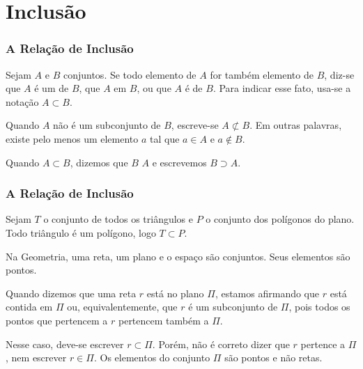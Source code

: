 \section{Inclusão}


\begin{frame}
\frametitle{A Relação de Inclusão} %

\begin{definicao}
Sejam $A$ e $B$ conjuntos. Se todo elemento de $A$ for também
elemento de $B$, diz-se que $A$ é um  de $B$, que
$A$  em $B$, ou que $A$ é  de $B$. Para
indicar esse fato, usa-se a notação $A \subset B$.

\end{definicao}

Quando $A$ não é um subconjunto de $B$, escreve-se $A \not\subset
B$. Em outras palavras, existe pelo menos um elemento $a$ tal que $a
\in A$ e $a \notin B$.
\bigskip

Quando $A \subset B$, dizemos que $B$  $A$ e escrevemos
$B \supset A$.


\end{frame}



\begin{frame}
\frametitle{A Relação de Inclusão} %

\begin{exemplo}
Sejam $T$ o conjunto de todos os triângulos e $P$ o conjunto dos
polígonos do plano. Todo triângulo é um polígono, logo $ T \subset
P$.
\end{exemplo}

\begin{exemplo}
Na Geometria, uma reta, um plano e o espaço são conjuntos. Seus
elementos são pontos.

Quando dizemos que uma reta $r$ está no plano $\Pi$, estamos
afirmando que $r$ está contida em $\Pi$ ou, equivalentemente, que
$r$ é um subconjunto de $\Pi$, pois todos os pontos que pertencem a
$r$ pertencem também a $\Pi$.

Nesse caso, deve-se escrever $ r \subset \Pi$. Porém, não é correto
dizer que $r$ pertence a $\Pi$, nem escrever $r \in \Pi$. Os
elementos do conjunto $\Pi$ são pontos e não retas.
\end{exemplo}

\end{frame}


